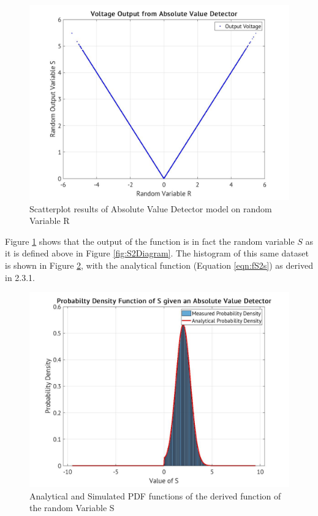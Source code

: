 \documentclass[a4paper, 11pt]{article}
\begin{document}
\begin{figure}[htbp]
\centering
\includegraphics[width=.9\linewidth]{./Images/AbsVal5.jpg}
\caption{\label{fig:S2Scat}Scatterplot results of Absolute Value Detector model on random Variable R}
\end{figure}

\bigskip
\noindent
Figure \ref{fig:S2Scat} shows that the output of the function is in fact the random variable \(S\) as it is defined above in Figure \ref{fig:S2Diagram}.
The histogram of this same dataset is shown in Figure \ref{fig:S2PDF}, with the analytical function (Equation \ref{eqn:fS2s}) as derived in 2.3.1.

\begin{figure}[htbp]
\centering
\includegraphics[width=.9\linewidth]{./Images/S2PDF6.jpg}
\caption{\label{fig:S2PDF}Analytical and Simulated PDF functions of the derived function of the random Variable S}
\end{figure}
\end{document}
